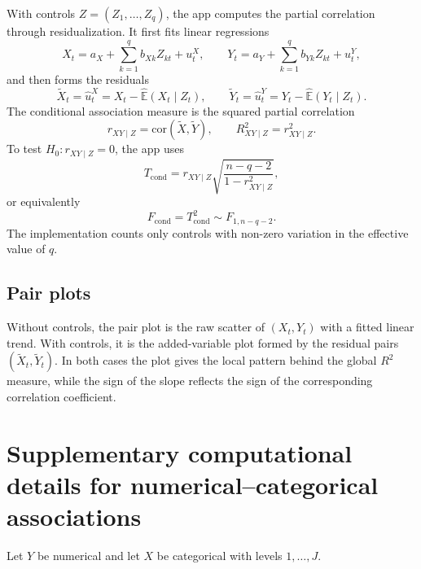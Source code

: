 \documentclass[11pt]{article}
\begin{document}
\begin{appendix}
With controls $Z = (Z_1, \dots, Z_q)$, the app computes the partial
correlation through residualization. It first fits linear regressions
\begin{equation}
X_t = a_X + \sum_{k=1}^{q} b_{Xk} Z_{kt} + u^X_t,
\qquad
Y_t = a_Y + \sum_{k=1}^{q} b_{Yk} Z_{kt} + u^Y_t,
\label{eq:app-resid-models}
\end{equation}
and then forms the residuals
\begin{equation}
\tilde{X}_t = \hat{u}^X_t = X_t - \widehat{\mathbb{E}}(X_t \mid Z_t),
\qquad
\tilde{Y}_t = \hat{u}^Y_t = Y_t - \widehat{\mathbb{E}}(Y_t \mid Z_t).
\label{eq:app-resids}
\end{equation}
The conditional association measure is the squared partial correlation
\begin{equation}
r_{XY\mid Z} = \mathrm{cor}(\tilde{X}, \tilde{Y}),
\qquad
R^2_{XY\mid Z} = r_{XY\mid Z}^2.
\label{eq:app-partial-r}
\end{equation}
To test $H_0: r_{XY\mid Z} = 0$, the app uses
\begin{equation}
T_{\mathrm{cond}}
=
r_{XY\mid Z}\sqrt{\frac{n-q-2}{1-r_{XY\mid Z}^2}},
\label{eq:app-t-partial}
\end{equation}
or equivalently
\begin{equation}
F_{\mathrm{cond}} = T_{\mathrm{cond}}^2 \sim F_{1,n-q-2}.
\label{eq:app-f-partial}
\end{equation}
The implementation counts only controls with non-zero variation in the
effective value of $q$.

\subsection{Pair plots}

Without controls, the pair plot is the raw scatter of $(X_t, Y_t)$ with a
fitted linear trend. With controls, it is the added-variable plot formed by
the residual pairs $(\tilde{X}_t, \tilde{Y}_t)$. In both cases the plot gives
the local pattern behind the global $R^2$ measure, while the sign of the slope
reflects the sign of the corresponding correlation coefficient.

\section{Supplementary computational details for numerical--categorical associations}
\label{app:numcat}

Let $Y$ be numerical and let $X$ be categorical with levels
$1, \dots, J$.


\end{appendix}
\end{document}
